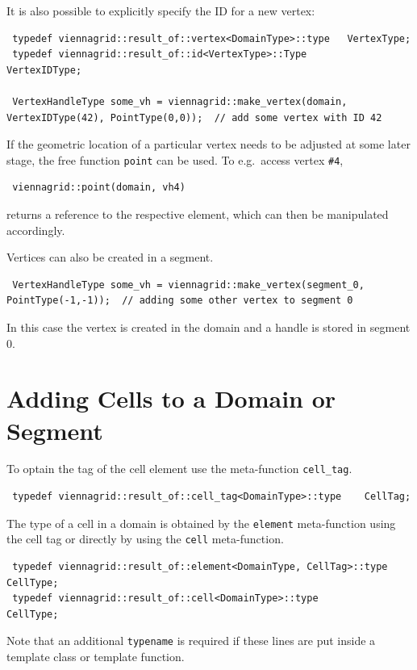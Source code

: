 It is also possible to explicitly specify the ID for a new vertex:
\begin{lstlisting}
 typedef viennagrid::result_of::vertex<DomainType>::type   VertexType;
 typedef viennagrid::result_of::id<VertexType>::Type       VertexIDType;
 
 VertexHandleType some_vh = viennagrid::make_vertex(domain, VertexIDType(42), PointType(0,0));  // add some vertex with ID 42
\end{lstlisting}

If the geometric location of a particular vertex needs to be adjusted at some later stage, the free function \lstinline|point| can be used. To e.g.~access vertex \lstinline|#4|,
\begin{lstlisting}
 viennagrid::point(domain, vh4)
\end{lstlisting}
returns a reference to the respective element, which can then be manipulated accordingly.

Vertices can also be created in a segment.
\begin{lstlisting}
 VertexHandleType some_vh = viennagrid::make_vertex(segment_0, PointType(-1,-1));  // adding some other vertex to segment 0
\end{lstlisting}
In this case the vertex is created in the domain and a handle is stored in segment 0.


\section{Adding Cells to a Domain or Segment}
To optain the tag of the cell element use the meta-function \lstinline|cell_tag|.
\begin{lstlisting}
 typedef viennagrid::result_of::cell_tag<DomainType>::type    CellTag;
\end{lstlisting}

The type of a cell in a domain is obtained by the \lstinline|element| meta-function using the cell tag or directly by using the \lstinline|cell| meta-function.
\begin{lstlisting}
 typedef viennagrid::result_of::element<DomainType, CellTag>::type    CellType;
 typedef viennagrid::result_of::cell<DomainType>::type                CellType;
\end{lstlisting}
Note that an additional \lstinline|typename| is required if these lines are put inside a template class or template function.

